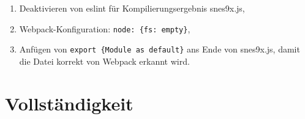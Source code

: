 \begin{enumerate}
\def\labelenumi{\arabic{enumi}.}
\tightlist
\item
  Deaktivieren von eslint für Kompilierungsergebnis snes9x.js,
\item
  Webpack-Konfiguration:
  \texttt{node:\ \{fs:\ \textquotesingle{}empty\textquotesingle{}\}},
\item
  Anfügen von \texttt{export\ \{Module\ as\ default\}} ans Ende von
  snes9x.js, damit die Datei korrekt von Webpack erkannt wird.
\end{enumerate}

\section{Vollständigkeit}\label{vollstuxe4ndigkeit}
